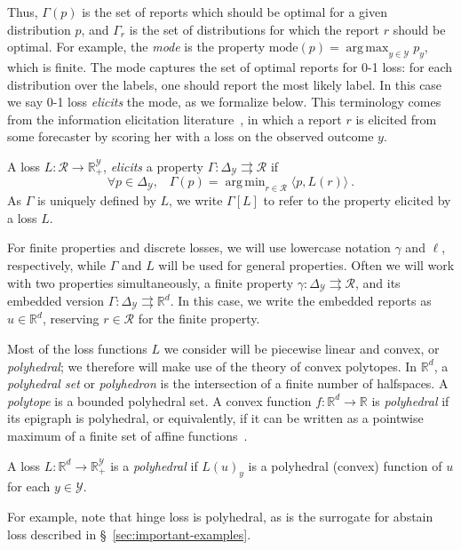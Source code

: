 \documentclass[anon,12pt]{colt2019}
\newcommand{\reals}{\mathbb{R}}
\newcommand{\prop}[1]{\Gamma[#1]}
\newcommand{\mode}{\mathrm{mode}}
\newcommand{\simplex}{\Delta_\Y}
\newcommand{\R}{\mathcal{R}}
\newcommand{\Y}{\mathcal{Y}}
\newcommand{\inprod}[2]{\langle #1, #2 \rangle}%
\newcommand{\toto}{\rightrightarrows}
\DeclareMathOperator*{\argmax}{arg\,max}
\DeclareMathOperator*{\argmin}{arg\,min}
\begin{document}
Thus, $\Gamma(p)$ is the set of reports which should be optimal for a given distribution $p$, and $\Gamma_r$ is the set of distributions for which the report $r$ should be optimal.
For example, the \emph{mode} is the property $\mode(p) = \argmax_{y\in\Y} p_y$, which is finite.
The mode captures the set of optimal reports for 0-1 loss: for each distribution over the labels, one should report the most likely label.
In this case we say 0-1 loss \emph{elicits} the mode, as we formalize below.
This terminology comes from the information elicitation literature~\citep{savage1971elicitation,osband1985information-eliciting,lambert2008eliciting}, in which a report $r$ is elicited from some forecaster by scoring her with a loss on the observed outcome $y$.

\begin{definition}[Elicits]
  A loss $L:\R\to\reals^\Y_+$, \emph{elicits} a property $\Gamma:\simplex \toto \R$ if
  \begin{equation}
    \forall p\in\simplex,\;\;\;\Gamma(p) = \argmin_{r \in \R} \inprod{p}{L(r)}~.
  \end{equation}
  As $\Gamma$ is uniquely defined by $L$, we write $\prop{L}$ to refer to the property elicited by a loss $L$.
\end{definition}

For finite properties and discrete losses, we will use lowercase notation $\gamma$ and $\ell$, respectively, while $\Gamma$ and $L$ will be used for general properties.
Often we will work with two properties simultaneously, a finite property $\gamma:\simplex\toto\R$, and its embedded version $\Gamma:\simplex\toto\reals^d$.
In this case, we write the embedded reports as $u\in\reals^d$, reserving $r\in\R$ for the finite property.

Most of the loss functions $L$ we consider will be piecewise linear and convex, or \emph{polyhedral}; we therefore will make use of the theory of convex polytopes.
In $\reals^d$, a \emph{polyhedral set} or \emph{polyhedron} is the intersection of a finite number of halfspaces.
A \emph{polytope} is a bounded polyhedral set.
A convex function $f:\reals^d\to\reals$ is \emph{polyhedral} if its epigraph is polyhedral, or equivalently, if it can be written as a pointwise maximum of a finite set of affine functions~\cite{rockafellar1997convex}.

\begin{definition}
  A loss $L: \reals^d \to \reals^{\Y}_+$ is a \emph{polyhedral} if $L(u)_y$ is a polyhedral (convex) function of $u$ for each $y\in\Y$.
\end{definition}
For example, note that hinge loss is polyhedral, as is the surrogate for abstain loss described in \S~\ref{sec:important-examples}.
\end{document}
